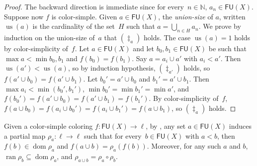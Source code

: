 \documentclass[10pt,a4paper]{article}
\newcommand{\NN}[0]{\mathbb{N}}
\newcommand{\dom}{\operatorname{dom}}
\newcommand{\ran}{\operatorname{ran}}
\newcommand{\us}{\operatorname{us}}
\newcommand{\FU}[0]{\mathsf{FU}} %
\numberwithin{theorem}{section}
\newtheorem{lemma}[theorem]{Lemma}
\begin{document}
\begin{proof}
The backward direction is immediate since for every~$n \in \NN$, $a_n \in \FU(X)$.
Suppose now $f$ is color-simple. Given $a \in \FU(X)$, the \emph{union-size} of $a$, written $\us(a)$ is the cardinality of the set~$H$ such that $a = \bigcup_{n \in H} a_n$. We prove by induction on the union-size of~$a$ that $(\ddagger_{a})$ holds. The case $\us(a) = 1$ holds by color-simplicity of~$f$. Let $a \in \FU(X)$ and let $b_0, b_1 \in \FU(X)$ be such that $\max a < \min b_0, b_1$ and $f(b_0) = f(b_1)$. Say $a = a_i \cup a'$ with $a_i < a'$.
Then $\us(a') < \us(a)$, so by induction hypothesis, $(\ddagger_{a'})$ holds, so $f(a' \cup b_0) = f(a' \cup b_1)$.
Let $b_0' = a' \cup b_0$ and $b_1' = a' \cup b_1$. Then $\max a_i < \min(b_0', b_1')$, $\min b_0' = \min b_1' = \min a'$, and $f(b_0') = f(a' \cup b_0) = f(a' \cup b_1) = f(b_1')$. By color-simplicity of~$f$, $f(a \cup b_0) = f(a_i \cup b_0') = f(a_i \cup b_1') = f(a \cup b_1)$, so $(\ddagger_a)$ holds. 
\end{proof}

Given a color-simple coloring $f : \FU(X) \to \ell$, by , any set $a \in \FU(X)$ induces a partial map $\rho_a : \ell \to \ell$ such that for every~$b \in \FU(X)$ with $a < b$, then $f(b) \in \dom \rho_a$ and $f(a \cup b) = \rho_a(f(b))$. Moreover, for any such $a$ and $b$, $\ran \rho_b \subseteq \dom \rho_a$, and $\rho_{a \cup b} = \rho_a \circ \rho_b$.
\end{document}
